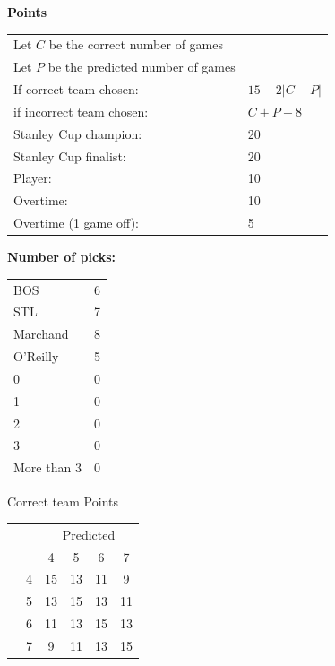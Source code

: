 \documentclass[10pt]{article}
\newcommand{\mccn}[2]{\multicolumn{#1}{c}{#2}}
\begin{document}
{\bf Points}\\
\begin{minipage}{10cm}
    \begin{tabular}{l l}
        Let $C$ be the correct number of games\\
        Let $P$ be the predicted number of games\\
        If correct team chosen:	   & $15 - 2 \left|{C - P}\right|$\\
        if incorrect team chosen:  & $C + P - 8$\\
        Stanley Cup champion:	& 20\\
        Stanley Cup finalist:	& 20\\
        Player:                 & 10\\
        Overtime:               & 10\\
        Overtime (1 game off):  & 5\\
    \end{tabular}

    \vspace{1cm}
    {\bf Number of picks:}\\
    \begin{tabular}{lc }
        BOS & 6 \\
        STL & 7 \\
        Marchand & 8 \\
        O'Reilly & 5 \\
        \rule{0pt}{3.5ex}0 & 0 & \\
        1 & 0 & \\
        2 & 0 & \\
        3 & 0 & \\
        More than 3 & 0 & 
    \end{tabular}
\end{minipage}
\begin{minipage}[t!]{4cm}
    \vspace{-2cm}
    \qquad Correct team Points\\
    \begin{tabular}{c l | c c c c }
        \mccn{2}{} & \mccn{4}{Predicted}\\
        & & 4 & 5 & 6 & 7\\\cline{2-6}
        \parbox[t]{2mm}{} & 4 & 15 & 13 & 11 & 9\\
        & 5 & 13 & 15 & 13 & 11\\
        & 6 & 11 & 13 & 15 & 13\\
        & 7 & 9 & 11 & 13 & 15
    \end{tabular}
\end{minipage}
\end{document}
